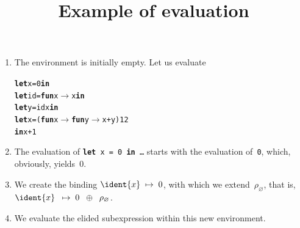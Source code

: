 \documentclass[wide]{slides}
\begin{document}
\begin{slide}
  \title{Example of evaluation}

  \begin{enumerate}

  \item The environment is initially empty. Let us evaluate
\begin{alltt}
\textbf{let} x = 0 \textbf{in}
\textbf{let} id = \textbf{fun} x \(\rightarrow\) x \textbf{in}
\textbf{let} y = id x \textbf{in}
\textbf{let} x = (\textbf{fun} x \(\rightarrow\) \textbf{fun} y \(\rightarrow\) x + y) 1 2
\textbf{in} x + 1
\end{alltt}

   \item The evaluation of \texttt{\textbf{let} x = 0 \textbf{in}
     \ldots} starts with the evaluation of~\texttt{0}, which,
     obviously, yields~\(0\).

   \item We create the binding $\ident{x} \; \mapsto \; 0$,
     with which we extend~\(\rho_\varnothing\), that is, $\ident{x}
     \;\; \mapsto \; 0 \;\; \oplus \;\; \rho_\varnothing$.

   \item We evaluate the elided subexpression within this new
     environment.

  \end{enumerate}

\end{slide}
\end{document}
